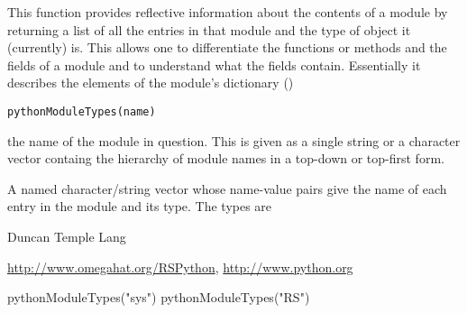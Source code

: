 \begin{Description}\relax
This function provides reflective information about the
contents of a module by returning a list of all the
entries in that module and the type of object it (currently) is.
This allows one to differentiate the functions or methods
and the fields of a module  and to understand what the fields
contain.
Essentially it describes the elements of the module's dictionary
()\end{Description}
\begin{Usage}
\begin{verbatim}
pythonModuleTypes(name)
\end{verbatim}
\end{Usage}
\begin{Arguments}
\begin{ldescription}
\item[\code{name}] the name of the module in question. This is given as a single string or
a character vector containg the hierarchy of module names in a top-down or top-first form.
\end{ldescription}
\end{Arguments}
\begin{Details}\relax
\end{Details}
\begin{Value}
A named character/string vector whose name-value pairs
give the name of each  entry in the module and its type.
The types are\end{Value}
\begin{Author}\relax
Duncan Temple Lang\end{Author}
\begin{References}\relax
\url{http://www.omegahat.org/RSPython},
\url{http://www.python.org}\end{References}
\begin{SeeAlso}\relax
\end{SeeAlso}
\begin{Examples}
\begin{ExampleCode}
 pythonModuleTypes("sys")
 pythonModuleTypes("RS")
\end{ExampleCode}
\end{Examples}

